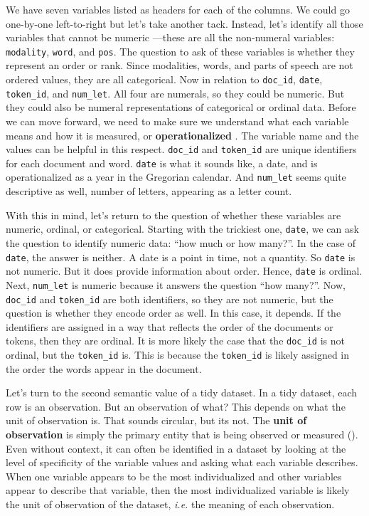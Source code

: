 \documentclass[
  letterpaper,
  krantz1]{latex/krantz-mod}
\theoremstyle{definition}
\theoremstyle{definition}
\theoremstyle{remark}
\begin{document}
We have seven variables listed as headers for each of the columns. We
could go one-by-one left-to-right but let's take another tack. Instead,
let's identify all those variables that cannot be numeric ---these are
all the non-numeral variables:
\texttt{modality}, \texttt{word}, and \texttt{pos}. The question to ask
of these variables is whether they represent an order or rank. Since
modalities, words, and parts of speech are not ordered values, they are
all categorical. Now in relation to \texttt{doc\_id}, \texttt{date},
\texttt{token\_id}, and \texttt{num\_let}. All four are numerals, so
they could be numeric. But they could also be numeral representations of
categorical or ordinal data. Before we can move forward, we need to make
sure we understand what each variable means and how it is measured, or
\textbf{operationalized} . The variable name and
the values can be helpful in this respect. \texttt{doc\_id} and
\texttt{token\_id} are unique identifiers for each document and word.
\texttt{date} is what it sounds like, a date, and is operationalized as
a year in the Gregorian calendar. And \texttt{num\_let} seems quite
descriptive as well, number of letters, appearing as a letter count.

With this in mind, let's return to the question of whether these
variables are numeric, ordinal, or categorical. Starting with the
trickiest one, \texttt{date}, we can ask the question to identify
numeric data: ``how much or how many?''. In the case of \texttt{date},
the answer is neither. A date is a point in time, not a quantity. So
\texttt{date} is not numeric. But it does
provide information about order. Hence, \texttt{date} is
ordinal. Next, \texttt{num\_let} is numeric
because it answers the question ``how many?''. Now, \texttt{doc\_id} and
\texttt{token\_id} are both identifiers, so they are not numeric, but
the question is whether they encode order as well. In this case, it
depends. If the identifiers are assigned in a way that reflects the
order of the documents or tokens, then they are ordinal. It is more
likely the case that the \texttt{doc\_id} is not ordinal, but the
\texttt{token\_id} is. This is because the \texttt{token\_id} is likely
assigned in the order the words appear in the document.

Let's turn to the second semantic value of a tidy dataset. In a tidy
dataset, each row is an observation. But an
observation of what? This depends on what the unit of observation
is. That sounds circular, but its not. The
\textbf{unit of observation} is simply the
primary entity that is being observed or measured
(). Even without context, it
can often be identified in a dataset by looking at the level of
specificity of the variable values and asking what each variable
describes. When one variable appears to be the most individualized and
other variables appear to describe that variable, then the most
individualized variable is likely the unit of observation of the
dataset, \emph{i.e.} the meaning of each observation.
\end{document}
